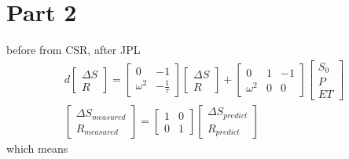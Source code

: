 \section{Part 2}
before from CSR, after JPL
\begin{gather*}
	d \begin{bmatrix}
		\Delta S\\
		R
	\end{bmatrix} = \begin{bmatrix}
	0 & -1 \\
	\omega^2 & -\frac{1}{\tau}
\end{bmatrix} \begin{bmatrix}
\Delta S\\
R
\end{bmatrix} + \begin{bmatrix}
0 & 1 & -1 \\
\omega^2 & 0 & 0
\end{bmatrix} \begin{bmatrix}
S_{0}\\
P\\
ET
\end{bmatrix} \\
\begin{bmatrix}
	\Delta S_{measured} \\
	R_{measured}
\end{bmatrix} = \begin{bmatrix}
1 & 0 \\
0 & 1
\end{bmatrix} \begin{bmatrix}
\Delta S_{predict} \\
R_{predict} 
\end{bmatrix} 
\end{gather*}
which means
